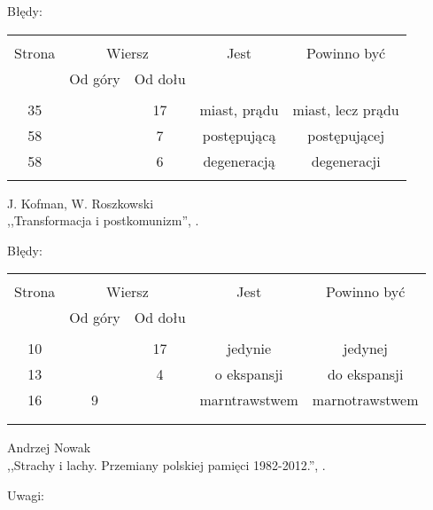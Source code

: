 \documentclass[a4paper,11pt]{article}
\newcommand{\Center}[1]{\begin{center} #1 \end{center}}
\begin{document}
Błędy:\\
\begin{center}
  \begin{tabular}{|c|c|c|c|c|}
    \hline
    & \multicolumn{2}{c|}{} & & \\
    Strona & \multicolumn{2}{c|}{Wiersz}& Jest & Powinno być \\ \cline{2-3}
    & Od góry & Od dołu &  &  \\ \hline
    & & & & \\
    35 & & 17 & miast, prądu & miast, lecz prądu \\
    58 & & 7 & postępującą & postępującej \\
    58 & & 6 & degeneracją & degeneracji \\
    & & & & \\ \hline
  \end{tabular}
\end{center}

\begin{center}
  J. Kofman, W. Roszkowski \\
  ,,Transformacja i postkomunizm'', \cite{KR99}.
\end{center}

Błędy:\\
\begin{center}
  \begin{tabular}{|c|c|c|c|c|}
    \hline
    & \multicolumn{2}{c|}{} & & \\
    Strona & \multicolumn{2}{c|}{Wiersz}& Jest & Powinno być \\ \cline{2-3}
    & Od góry & Od dołu &  &  \\ \hline
    & & & & \\
    10 & & 17 & jedynie & jedynej \\
    13 & & 4 & o ekspansji & do ekspansji \\
    16 & 9 & & marntrawstwem & marnotrawstwem \\
    & & & & \\
    & & & &  \\ \hline
  \end{tabular}
\end{center}


\begin{center}
  Andrzej Nowak \\
  ,,Strachy i lachy. Przemiany polskiej pamięci 1982-2012.'',
  \cite{Now12}.
\end{center}

\Center{Uwagi:}
\end{document}
